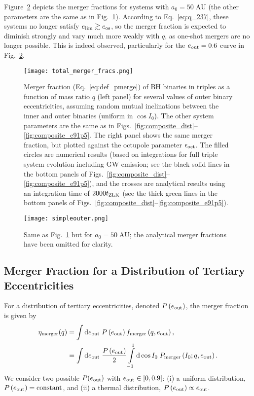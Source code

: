 \documentclass[
        fleqn,
        usenatbib,
    ]{mnras}
\newcommand*{\p}[1]{\left(#1\right)}
\begin{document}
Figure~\ref{fig:sweepbin_simpleouter} depicts the merger fractions for systems
with $a_0 = 50\;\mathrm{AU}$ (the other parameters are the same as in
Fig.~\ref{fig:total_merger_fracs}). According to Eq.~\eqref{eq:q_237}, these
systems no longer satisfy $e_{\lim} \gtrsim e_{\rm os}$, so the
merger fraction is expected to diminish strongly and vary much more weakly with
$q$, as one-shot mergers are no longer possible. This is indeed observed,
particularly for the $e_{\rm out} = 0.6$ curve in
Fig.~\ref{fig:sweepbin_simpleouter}.

\begin{figure*}
    \centering
    \texttt{[image: total\_merger\_fracs.png]}
    \caption{
    Merger fraction (Eq.~\ref{eq:def_pmerge}) of BH binaries in triples as a
    function of mass ratio $q$ (left panel) for several values of outer binary
    eccentricities, assuming random mutual inclinations between the inner and
    outer binaries (uniform in $\cos I_0$). The other system parameters are the
    same as in Figs.~\ref{fig:composite_dist}--\ref{fig:composite_e91p5}. The
    right panel shows the same merger fraction, but plotted against the octupole
    parameter $\epsilon_{\rm oct}$.  The filled circles are numerical results
    (based on integrations for full triple system evolution including GW
    emission; see the black solid lines in the bottom panels of
    Figs.~\ref{fig:composite_dist}--\ref{fig:composite_e91p5}), and the crosses
    are analytical results using an integration time of $2000 t_{\rm ZLK}$
    (see the thick green lines in the bottom panels of
    Figs.~\ref{fig:composite_dist}--\ref{fig:composite_e91p5}).
    }\label{fig:total_merger_fracs}
\end{figure*}
\begin{figure*}
    \centering
    \texttt{[image: simpleouter.png]}
    \caption{Same as Fig.~\ref{fig:total_merger_fracs} but for $a_0 =
    50\;\mathrm{AU}$; the analytical merger fractions have been omitted for
    clarity.
    }\label{fig:sweepbin_simpleouter}
\end{figure*}

\subsection{Merger Fraction for a Distribution of Tertiary Eccentricities}

For a distribution of tertiary eccentricities, denoted $P\p{e_{\rm out}}$, the
merger fraction is given by
\begin{align}
    \eta_{\rm merger}(q) &= \int \mathrm{d}e_{\rm out}\;
            P\p{e_{\rm out}} f_{\rm merger}\p{q, e_{\rm out}},\nonumber\\
        &= \int\limits\mathrm{d} e_{\rm out}\; \frac{P\p{e_{\rm out}}}{2}
            \int\limits_{-1}^1\mathrm{d} \cos I_0\; P_{\rm merger}\p{I_0; q,
            e_{\rm out}}.
        \label{eq:def_eta_merge}
\end{align}
We consider two possible $P(e_{\rm out})$ with $e_{\rm out} \in [0, 0.9]$: (i) a
uniform distribution, $P\p{e_{\rm out}} = \textrm{constant}$, and (ii) a thermal
distribution, $P\p{e_{\rm out}} \propto e_{\rm out}$.
\end{document}
